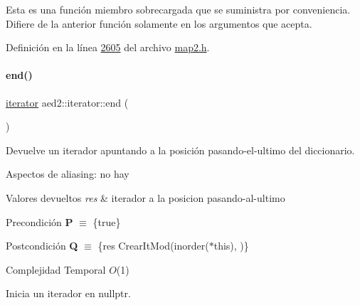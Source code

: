 Esta es una función miembro sobrecargada que se suministra por conveniencia. Difiere de la anterior función solamente en los argumentos que acepta. 

Definición en la línea \hyperlink{map2_8h_source_l02605}{2605} del archivo \hyperlink{map2_8h_source}{map2.\+h}.

\mbox{\label{classaed2_1_1iterator_a67caf9468be999e9be96b7add5d79946_a67caf9468be999e9be96b7add5d79946}} 
\paragraph{\texorpdfstring{end()}{end()}\hspace{0.1cm}{\footnotesize\ttfamily [1/2]}}
{\footnotesize\ttfamily \hyperlink{classaed2_1_1iterator_1_1iterator}{iterator} aed2\+::iterator\+::end (\begin{DoxyParamCaption}{ }\end{DoxyParamCaption})\hspace{0.3cm}{\ttfamily [inline]}}



Devuelve un iterador apuntando a la posición pasando-\/el-\/ultimo del diccionario. 

\begin{DoxyParagraph}{Aspectos de aliasing\+:}
no hay
\end{DoxyParagraph}

\begin{DoxyRetVals}{Valores devueltos}
{\em res} & iterador a la posicion pasando-\/al-\/ultimo\\
\hline
\end{DoxyRetVals}
\begin{DoxyPrecond}{Precondición}
{\bfseries P} $\equiv$ \{true\} 
\end{DoxyPrecond}
\begin{DoxyPostcond}{Postcondición}
{\bfseries Q} $\equiv$ \{res  Crear\+It\+Mod(inorder($\ast$this),  )\}
\end{DoxyPostcond}

\begin{DoxyDescription}
\item[Complejidad Temporal]$O$(1)
\end{DoxyDescription}

Inicia un iterador en nullptr. 

